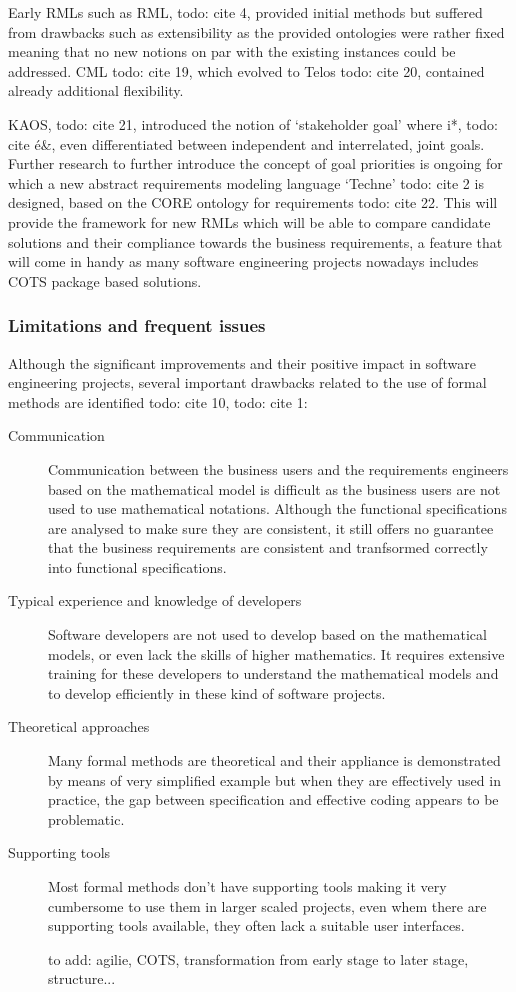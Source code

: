 Early RMLs such as RML, todo: cite 4, provided initial methods but suffered from drawbacks such as extensibility as the provided ontologies were rather fixed meaning that no new notions on par with the existing instances could be addressed. CML todo: cite 19, which evolved to Telos todo: cite 20, contained already additional flexibility. 

KAOS, todo: cite 21, introduced the notion of `stakeholder goal' where i*, todo: cite é&, even differentiated between independent and interrelated, joint goals.
Further research to further introduce the concept of goal priorities is ongoing for which a new abstract requirements modeling language `Techne' todo: cite 2 is designed, based on the CORE ontology for requirements todo: cite 22. This will provide the framework for new RMLs which will be able to compare candidate solutions and their compliance towards the business requirements, a feature that will come in handy as many software engineering projects nowadays includes COTS package based solutions.

\subsubsection{Limitations and frequent issues}
Although the significant improvements and their positive impact in software engineering projects, several important drawbacks related to the use of formal methods are identified todo: cite 10, todo: cite 1:
\begin{description}
	\item[Communication] Communication between the business users and the requirements engineers based on the mathematical model is difficult as the business users are not used to use mathematical notations. Although the functional specifications are analysed to make sure they are consistent, it still offers no guarantee that the business requirements are consistent and tranfsormed correctly into functional specifications.
	\item[Typical experience and knowledge of developers] Software developers are not used to develop based on the mathematical models, or even lack the skills of higher mathematics. It requires extensive training for these developers to understand the mathematical models and to develop efficiently in these kind of software projects.
	\item[Theoretical approaches] Many formal methods are theoretical and their appliance is demonstrated by means of very simplified example but when they are effectively used in practice, the gap between specification and effective coding appears to be problematic.
	\item[Supporting tools] Most formal methods don't have supporting tools making it very cumbersome to use them in larger scaled projects, even whem there are supporting tools available, they often lack a suitable user interfaces.

to add: agilie, COTS, transformation from early stage to later stage, structure...
	
\end{description}


